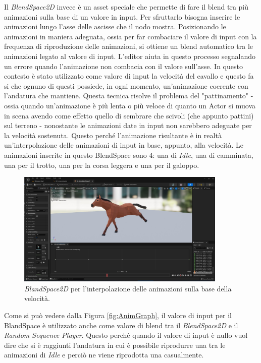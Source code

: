     Il \textit{BlendSpace2D} invece è un asset speciale che permette di fare il blend tra più animazioni sulla base di un valore in input.
    Per sfruttarlo bisogna inserire le animazioni lungo l'asse delle ascisse che il nodo mostra.
    Posizionando le animazioni in maniera adeguata, ossia per far combaciare il valore di input con la frequenza di riproduzione delle animazioni, si ottiene un blend automatico tra le animazioni legato al valore di input.
    L'editor aiuta in questo processo segnalando un errore quando l'animazione non combacia con il valore sull'asse.
    In questo contesto è stato utilizzato come valore di input la velocità del cavallo e questo fa si che ognuno di questi possiede, in ogni momento, un'animazione coerente con l'andatura che mantiene.
    Questa tecnica risolve il problema del "pattinamento" - ossia quando un'animazione è più lenta o più veloce di quanto un Actor si muova in scena avendo come effetto quello di sembrare che scivoli (che appunto pattini) sul terreno - nonostante le animazioni date in input non sarebbero adeguate per la velocità sostenuta.
    Questo perché l'animazione risultante è in realtà un'interpolazione delle animazioni di input in base, appunto, alla velocità.
    Le animazioni inserite in questo BlendSpace sono 4: una di \textit{Idle}, una di camminata, una per il trotto, una per la corsa leggera e una per il galoppo.

    \begin{figure}[!ht]
        \centering
        \includegraphics[width=10cm]{figure/HorseBlendSpaceGalop.JPG}
        \caption{\textit{BlandSpace2D} per l'interpolazione delle animazioni sulla base della velocità.}
    \end{figure}

    Come si può vedere dalla Figura \ref{fig:AnimGraph}, il valore di input per il BlandSpace è utilizzato anche come valore di blend tra il \textit{BlendSpace2D} e il \textit{Random Sequence Player}.
    Questo perché quando il valore di input è nullo vuol dire che si è raggiunti l'andatura in cui è possibile riprodurre una tra le animazioni di \textit{Idle} e perciò ne viene riprodotta una casualmente. 

